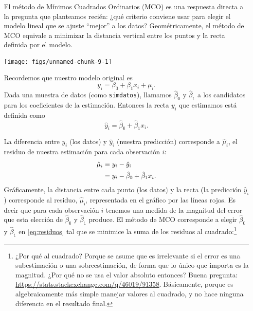 \documentclass{article}\usepackage[]{graphicx}\usepackage[]{color}
\newenvironment{knitrout}{}{} %
\begin{document}
El método de Mínimos Cuadrados Ordinarios (MCO) es una respuesta directa a la pregunta que planteamos recién: ¿qué criterio conviene usar para elegir el modelo lineal que se ajuste ``mejor'' a los datos?
Geométricamente, el método de MCO equivale a minimizar la distancia vertical entre los puntos y la recta definida por el modelo.

\begin{knitrout}
\color{fgcolor}

{\centering \texttt{[image: figs/unnamed-chunk-9-1]} 

}



\end{knitrout}

Recordemos que nuestro modelo original es
\begin{equation*}
y_i = \beta_0 + \beta_1 x_i + \mu_i.
\end{equation*}
Dada una muestra de datos (como \verb|simdatos|), llamamos $\hat\beta_0$ y $\hat\beta_1$ a los candidatos para los coeficientes de la estimación. Entonces la recta $y_i$ que estimamos está definida como
\begin{equation}
\hat y_i = \hat\beta_0 + \hat\beta_1 x_i.
\end{equation}

La diferencia entre $y_i$ (los datos) y $\hat y_i$ (nuestra predicción) corresponde a $\hat\mu_i$, el residuo de nuestra estimación para cada observación $i$: 
\begin{align}
\hat \mu_i &= y_i - \hat y_i \notag \\
           &= y_i - \hat\beta_0 + \hat\beta_1 x_i.
\label{eq:residuos}
\end{align}
Gráficamente, la distancia entre cada punto (los datos) y la recta (la predicción $\hat y_i$)  corresponde al residuo, $\hat\mu_i$, representada en el gráfico por las líneas rojas. 
Es decir que para cada observación $i$ tenemos una medida de la magnitud del error que esta elección de $\hat\beta_0$ y $\hat\beta_1$ produce.
El método de MCO corresponde a elegir $\hat\beta_0$ y $\hat\beta_1$ en \eqref{eq:residuos} tal que se minimice la suma de los residuos al cuadrado:\footnote{¿Por qué al cuadrado? Porque se asume que es irrelevante si el error es una subestimación o una sobreestimación, de forma que lo único que importa es la magnitud. ¿Por qué no se usa el valor absoluto entonces? Buena pregunta: \url{https://stats.stackexchange.com/q/46019/91358}. Básicamente, porque es algebraicamente más simple manejar valores al cuadrado, y no hace ninguna diferencia en el resultado final.}
\end{document}
